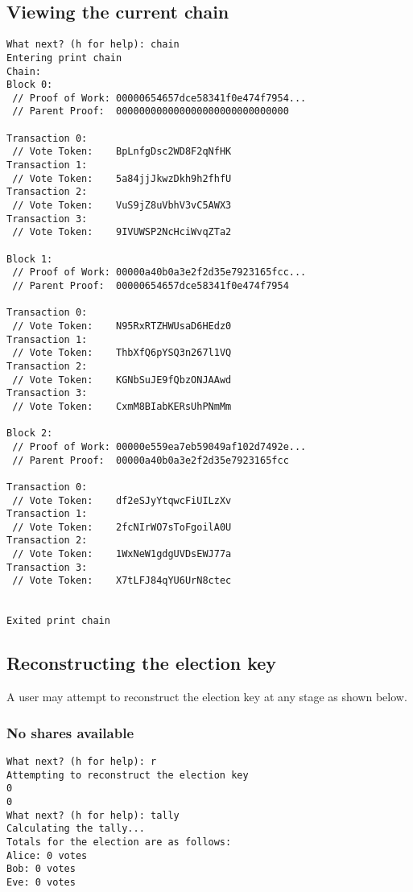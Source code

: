 \documentclass[a4paper,12pt]{article}
\begin{document}
\subsection{Viewing the current chain}
\begin{verbatim}
What next? (h for help): chain
Entering print chain
Chain:
Block 0:
 // Proof of Work: 00000654657dce58341f0e474f7954...
 // Parent Proof:  000000000000000000000000000000

Transaction 0:
 // Vote Token:    BpLnfgDsc2WD8F2qNfHK
Transaction 1:
 // Vote Token:    5a84jjJkwzDkh9h2fhfU
Transaction 2:
 // Vote Token:    VuS9jZ8uVbhV3vC5AWX3
Transaction 3:
 // Vote Token:    9IVUWSP2NcHciWvqZTa2

Block 1:
 // Proof of Work: 00000a40b0a3e2f2d35e7923165fcc...
 // Parent Proof:  00000654657dce58341f0e474f7954

Transaction 0:
 // Vote Token:    N95RxRTZHWUsaD6HEdz0
Transaction 1:
 // Vote Token:    ThbXfQ6pYSQ3n267l1VQ
Transaction 2:
 // Vote Token:    KGNbSuJE9fQbzONJAAwd
Transaction 3:
 // Vote Token:    CxmM8BIabKERsUhPNmMm

Block 2:
 // Proof of Work: 00000e559ea7eb59049af102d7492e...
 // Parent Proof:  00000a40b0a3e2f2d35e7923165fcc

Transaction 0:
 // Vote Token:    df2eSJyYtqwcFiUILzXv
Transaction 1:
 // Vote Token:    2fcNIrWO7sToFgoilA0U
Transaction 2:
 // Vote Token:    1WxNeW1gdgUVDsEWJ77a
Transaction 3:
 // Vote Token:    X7tLFJ84qYU6UrN8ctec


Exited print chain
\end{verbatim}

\subsection{Reconstructing the election key}
A user may attempt to reconstruct the election key at any stage as shown below.

\subsubsection{No shares available}
\begin{verbatim}
What next? (h for help): r
Attempting to reconstruct the election key
0
0
What next? (h for help): tally
Calculating the tally...
Totals for the election are as follows:
Alice: 0 votes
Bob: 0 votes
Eve: 0 votes
\end{verbatim}
\end{document}
